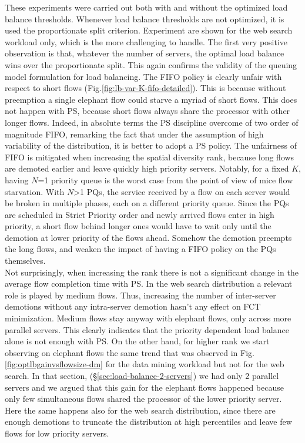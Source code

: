These experiments were carried out both with and without the optimized load balance thresholds. Whenever load balance thresholds are not optimized, it is used the proportionate split criterion. Experiment are shown for the web search workload only, which is the more challenging to handle. The first very positive observation is that, whatever the number of servers, the optimal load balance wins over the proportionate split. This again confirms the validity of the queuing model formulation for load balancing. 
The FIFO policy is clearly unfair with respect to short flows (Fig.\ref{fig:lb-var-K-fifo-detailed}). This is because without preemption a single elephant flow could starve a myriad of short flows. This does not happen with PS, because short flows always share the processor with other longer flows. Indeed, in absolute terms the PS discipline overcome of two order of magnitude FIFO, remarking the fact that under the assumption of high variability of the distribution, it is better to adopt a PS policy. The unfairness of FIFO is mitigated when increasing the spatial diversity rank, because long flows are demoted earlier and leave quickly high priority servers. Notably, for a fixed $K$, having $N$=1 priority queue is the worst case from the point of view of mice flow starvation. With $N$>1 PQs, the service received by a flow on each server would be broken in multiple phases, each on a different priority queue. Since the PQs are scheduled in Strict Priority order and newly arrived flows enter in high priority, a short flow behind longer ones would have to wait only until the demotion at lower priority of the flows ahead. Somehow the demotion preempts the long flows, and weaken the impact of having a FIFO policy on the PQs themselves. \\
Not surprisingly, when increasing the rank there is not a significant change in the average flow completion time with PS. In the web search distribution a relevant role is played by medium flows. Thus, increasing the number of inter-server demotions without any intra-server demotion hasn't any effect on FCT minimization. Medium flows stay anyway with elephant flows, only across more parallel servers. This clearly indicates that the priority dependent load balance alone is not enough with PS. On the other hand, for higher rank we start observing on elephant flows the same trend that was observed in Fig.\ref{fig:optlbgainvsflowsize-dm} for the data mining workload but not for the web search. In that section, (\S \ref{sec:load-balance-2-servers}) we had only 2 parallel servers and we argued that this gain for the elephant flows happened because only few simultaneous flows shared the processor of the lower priority server. Here the same happens also for the web search distribution, since there are enough demotions to truncate the distribution at high percentiles and leave few flows for low priority servers.

